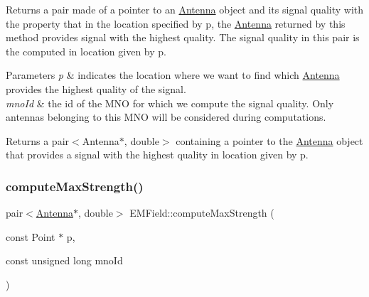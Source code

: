 Returns a pair made of a pointer to an \hyperlink{class_antenna}{Antenna} object and its signal quality with the property that in the location specified by p, the \hyperlink{class_antenna}{Antenna} returned by this method provides signal with the highest quality. The signal quality in this pair is the computed in location given by p. 
\begin{DoxyParams}{Parameters}
{\em p} & indicates the location where we want to find which \hyperlink{class_antenna}{Antenna} provides the highest quality of the signal. \\
\hline
{\em mno\+Id} & the id of the M\+NO for which we compute the signal quality. Only antennas belonging to this M\+NO will be considered during computations. \\
\hline
\end{DoxyParams}
\begin{DoxyReturn}{Returns}
a pair$<$\+Antenna$\ast$, double$>$ containing a pointer to the \hyperlink{class_antenna}{Antenna} object that provides a signal with the highest quality in location given by p. 
\end{DoxyReturn}
\mbox{\label{class_e_m_field_a9a3cdbca4fcf408ce58a30fb98de1bbb}} 
\subsubsection{\texorpdfstring{compute\+Max\+Strength()}{computeMaxStrength()}}
{\footnotesize\ttfamily pair$<$\hyperlink{class_antenna}{Antenna}$\ast$, double$>$ E\+M\+Field\+::compute\+Max\+Strength (\begin{DoxyParamCaption}\item[{const Point $\ast$}]{p,  }\item[{const unsigned long}]{mno\+Id }\end{DoxyParamCaption})}


